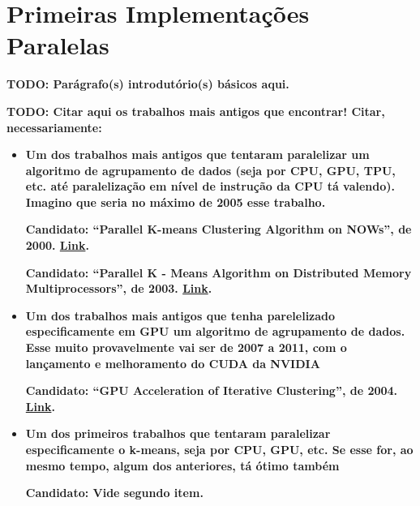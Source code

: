 \documentclass[12pt,
openright, 
oneside, %
a4paper,    %
brazil]{facom-ufu-abntex2}
\begin{document}

\section{Primeiras Implementações Paralelas}


\textbf{TODO: Parágrafo(s) introdutório(s) básicos aqui.}


\textbf{TODO: Citar aqui os trabalhos mais antigos que encontrar! Citar, necessariamente:}

\begin{itemize}
  \item \textbf{Um dos trabalhos mais antigos que tentaram paralelizar um algoritmo de agrupamento de dados (seja por CPU, GPU, TPU, etc. até paralelização em nível de instrução da CPU tá valendo). Imagino que seria no máximo de 2005 esse trabalho.} 

  \textbf{Candidato: \enquote{Parallel K-means Clustering Algorithm on NOWs}, de 2000. \href{https://citeseerx.ist.psu.edu/document?repid=rep1&type=pdf&doi=6197ce32309824420aac79f975e028e440c2be96}{Link}.}

  \textbf{Candidato: \enquote{Parallel K - Means Algorithm on Distributed Memory Multiprocessors}, de 2003. \href{https://citeseerx.ist.psu.edu/document?repid=rep1&type=pdf&doi=5598bf67cef4f2727da0b0b94ba085349c7c45e7}{Link}.}

  \item \textbf{Um dos trabalhos mais antigos que tenha parelelizado especificamente em GPU um algoritmo de agrupamento de dados. Esse muito provavelmente vai ser de 2007 a 2011, com o lançamento e melhoramento do CUDA da NVIDIA}

  \textbf{Candidato: \enquote{GPU Acceleration of Iterative Clustering}, de 2004. \href{https://www.researchgate.net/profile/John-Hart-17/publication/250176198_GPU_Acceleration_of_Iterative_Clustering/links/5447f8160cf2d62c30529d02/GPU-Acceleration-of-Iterative-Clustering.pdf}{Link}.}

  \item \textbf{Um dos primeiros trabalhos que tentaram paralelizar especificamente o k-means, seja por CPU, GPU, etc. Se esse for, ao mesmo tempo, algum dos anteriores, tá ótimo também}

  \textbf{Candidato: Vide segundo item.}
\end{itemize}
\end{document}
